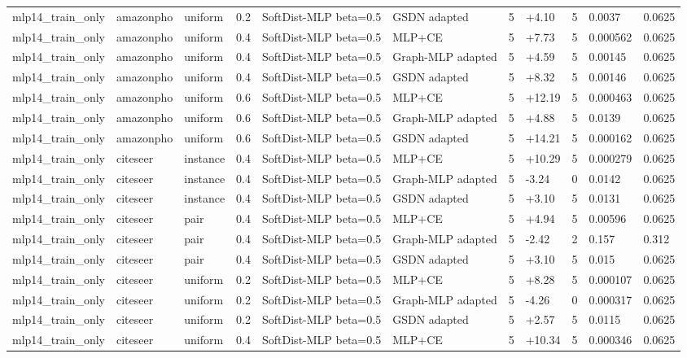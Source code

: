 \begin{table}[t]
\begin{tabular}{llllllrlrll}
mlp14_train_only & amazonpho & uniform & 0.2 & SoftDist-MLP beta=0.5 & GSDN adapted & 5 & +4.10 & 5 & 0.0037 & 0.0625 \\
mlp14_train_only & amazonpho & uniform & 0.4 & SoftDist-MLP beta=0.5 & MLP+CE & 5 & +7.73 & 5 & 0.000562 & 0.0625 \\
mlp14_train_only & amazonpho & uniform & 0.4 & SoftDist-MLP beta=0.5 & Graph-MLP adapted & 5 & +4.59 & 5 & 0.00145 & 0.0625 \\
mlp14_train_only & amazonpho & uniform & 0.4 & SoftDist-MLP beta=0.5 & GSDN adapted & 5 & +8.32 & 5 & 0.00146 & 0.0625 \\
mlp14_train_only & amazonpho & uniform & 0.6 & SoftDist-MLP beta=0.5 & MLP+CE & 5 & +12.19 & 5 & 0.000463 & 0.0625 \\
mlp14_train_only & amazonpho & uniform & 0.6 & SoftDist-MLP beta=0.5 & Graph-MLP adapted & 5 & +4.88 & 5 & 0.0139 & 0.0625 \\
mlp14_train_only & amazonpho & uniform & 0.6 & SoftDist-MLP beta=0.5 & GSDN adapted & 5 & +14.21 & 5 & 0.000162 & 0.0625 \\
mlp14_train_only & citeseer & instance & 0.4 & SoftDist-MLP beta=0.5 & MLP+CE & 5 & +10.29 & 5 & 0.000279 & 0.0625 \\
mlp14_train_only & citeseer & instance & 0.4 & SoftDist-MLP beta=0.5 & Graph-MLP adapted & 5 & -3.24 & 0 & 0.0142 & 0.0625 \\
mlp14_train_only & citeseer & instance & 0.4 & SoftDist-MLP beta=0.5 & GSDN adapted & 5 & +3.10 & 5 & 0.0131 & 0.0625 \\
mlp14_train_only & citeseer & pair & 0.4 & SoftDist-MLP beta=0.5 & MLP+CE & 5 & +4.94 & 5 & 0.00596 & 0.0625 \\
mlp14_train_only & citeseer & pair & 0.4 & SoftDist-MLP beta=0.5 & Graph-MLP adapted & 5 & -2.42 & 2 & 0.157 & 0.312 \\
mlp14_train_only & citeseer & pair & 0.4 & SoftDist-MLP beta=0.5 & GSDN adapted & 5 & +3.10 & 5 & 0.015 & 0.0625 \\
mlp14_train_only & citeseer & uniform & 0.2 & SoftDist-MLP beta=0.5 & MLP+CE & 5 & +8.28 & 5 & 0.000107 & 0.0625 \\
mlp14_train_only & citeseer & uniform & 0.2 & SoftDist-MLP beta=0.5 & Graph-MLP adapted & 5 & -4.26 & 0 & 0.000317 & 0.0625 \\
mlp14_train_only & citeseer & uniform & 0.2 & SoftDist-MLP beta=0.5 & GSDN adapted & 5 & +2.57 & 5 & 0.0115 & 0.0625 \\
mlp14_train_only & citeseer & uniform & 0.4 & SoftDist-MLP beta=0.5 & MLP+CE & 5 & +10.34 & 5 & 0.000346 & 0.0625 \\

\end{tabular}
\end{table}
